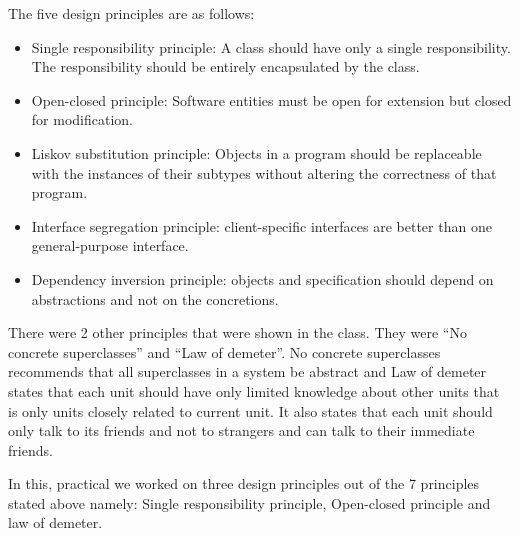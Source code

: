 \documentclass[12pt]{article}
\begin{document}
The five design principles are as follows:

\begin{itemize}
    \item Single responsibility principle: A class should have only a single responsibility. The responsibility should be entirely encapsulated by the class.
    \item Open-closed principle: Software entities must be open for extension but closed for modification.
    \item Liskov substitution principle: Objects in a program should be replaceable with the instances of their subtypes without altering the correctness of that program.
    \item Interface segregation principle: client-specific interfaces are better than one general-purpose interface.
    \item Dependency inversion principle: objects and specification should depend on abstractions and not on the concretions.
\end{itemize}

There were 2 other principles that were shown in the class. They were ``No concrete superclasses'' and ``Law of demeter''. No concrete superclasses recommends that all superclasses in a system be abstract and Law of demeter states that each unit should have only limited knowledge about other units that is only units closely related to current unit. It also states that each unit should only talk to its friends and not to strangers and can talk to their immediate friends.

In this, practical we worked on three design principles out of the 7 principles stated above namely: Single responsibility principle, Open-closed principle and law of demeter.
\end{document}
